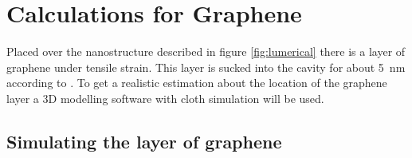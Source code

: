 \newpage
\section{Calculations for Graphene}
\label{sec:calculations}

Placed over the nanostructure described in figure \ref{fig:lumerical} there is a layer of graphene under tensile strain. This layer is sucked into the cavity for about \SI{5}{nm} according to \cite{heeg}. To get a realistic estimation about the location of the graphene layer a 3D modelling software with cloth simulation will be used.

\subsection{Simulating the layer of graphene}

